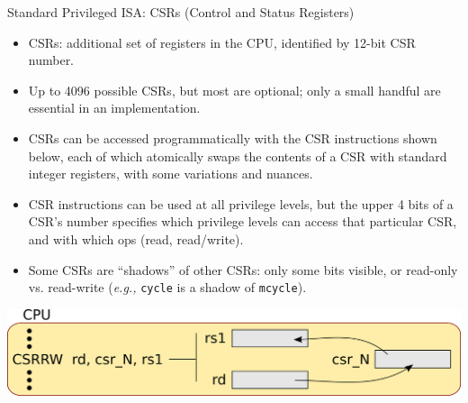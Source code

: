 \documentclass{article}
\newcommand{\hm}{\hspace*{1em}}
\newcommand{\eg}{\emph{e.g.,}}
\begin{document}
\clearpage


\begin{center}
  {\Huge
    Standard Privileged ISA: CSRs (Control and Status Registers)}

  \vspace*{0.2in}

  \begin{minipage}{9.5in}\Large
    \begin{itemize}

      \item CSRs: additional set of registers in the CPU, identified
        by 12-bit CSR number.

      \item Up to 4096 possible CSRs, but most are optional; only a
        small handful are essential in an implementation.

      \item CSRs can be accessed programmatically with the CSR
        instructions shown below, each of which atomically swaps the
        contents of a CSR with standard integer registers, with some
        variations and nuances.

      \item CSR instructions can be used at all privilege levels, but
        the upper 4 bits of a CSR's number specifies which privilege
        levels can access that particular CSR, and with which
        ops (read, read/write).

      \item Some CSRs are ``shadows'' of other CSRs: only some bits
        visible, or read-only vs. read-write ({\eg} {\tt cycle} is a
        shadow of {\tt mcycle}).
    \end{itemize}

    \hm

    \begin{center}

      \hm

      \includegraphics[width=7in]{Figs/CSRRW.png}
    \end{center}

  \end{minipage}
\end{center}
\end{document}

